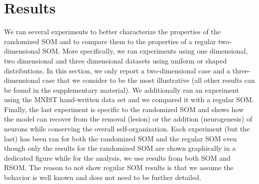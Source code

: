 
\section{Results}

We ran several experiments to better characterize the properties of the randomized SOM and to compare them to the properties of a regular two-dimensional SOM. More specifically, we ran experiments using one dimensional, two dimensional and three dimensional datasets using uniform or shaped distributions. In this section, we only report a two-dimensional case and a three-dimensional case that we consider to be the most illustrative (all other results can be found in the supplementary material). We additionally ran an experiment using the MNIST hand-written data set and we compared it with a regular SOM. Finally, the last experiment is specific to the randomized SOM and shows how the model can recover from the removal (lesion) or the addition (neurogenesis) of neurons while conserving the overall self-organization. Each experiment (but the last) has been ran for both the randomized SOM and the regular SOM even though only the results for the randomized SOM are shown graphically in a dedicated figure while for the analysis, we use results from both SOM and RSOM. The reason to not show regular SOM results is that we assume the behavior is well known and does not need to be further detailed. 








